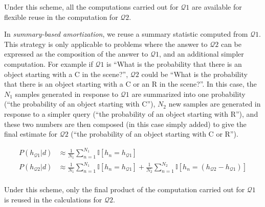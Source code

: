 Under this scheme, all the computations carried out for $\mathcal{Q}1$ are available for flexible reuse in the computation for $\mathcal{Q}2$. 

In \emph{summary-based amortization}, we reuse a summary statistic computed from $\mathcal{Q}1$. This strategy is only applicable to problems where the answer to $\mathcal{Q}2$ can be expressed as the composition of the answer to $\mathcal{Q}1$, and an additional simpler computation. For example if $\mathcal{Q}1$ is ``What is the probability that there is an object starting with a C in the scene?'', $\mathcal{Q}2$ could be ``What is the probability that there is an object starting with a C or an R in the scene?''. In this case, the $N_1$ samples generated in response to $\mathcal{Q}1$ are summarized into one probability (``the probability of an object starting with C''), $N_2$ new samples are generated in response to a simpler query (``the probability of an object starting with R''), and these two numbers are then composed (in this case simply added) to give the final estimate for $\mathcal{Q}2$ (``the probability of an object starting with C or R''). 


\begin{align*}
\textstyle
P(h_{\mathcal{Q}1}|d) & \approx \frac{1}{N_1}\sum_{n=1}^{N_1} \mathbb{I}[h_n=h_{\mathcal{Q}1}]\\
P(h_{\mathcal{Q}2}|d) & \approx \frac{1}{N_1}\sum_{n=1}^{N_1} \mathbb{I}[h_n=h_{\mathcal{Q}1}] + \frac{1}{N_2}\sum_{n=1}^{N_2} \mathbb{I}[h_n= (h_{\mathcal{Q}2} - h_{\mathcal{Q}1})]\\
\end{align*}


Under this scheme, only the final product of the computation carried out for $\mathcal{Q}1$ is reused in the calculations for $\mathcal{Q}2$.
